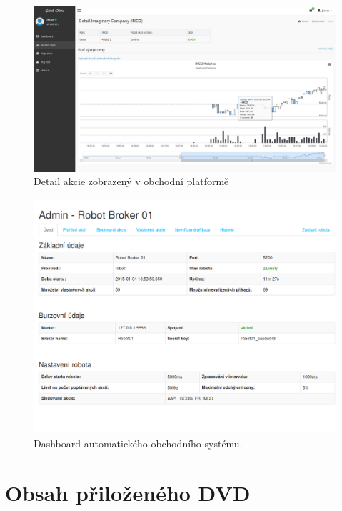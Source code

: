 \documentclass[thesis=M,czech]{FITthesis}[2012/06/26]
\begin{document}
\begin{figure}[h]
	\centering
	\includegraphics[width=1\textwidth]{images/screeny/detail_akcie}
 	\caption[Detail akcie zobrazený v obchodní platformě]{Detail akcie zobrazený v obchodní platformě}
 	\label{fig:debugger}
\end{figure}


\begin{figure}[h]
	\centering
	\includegraphics[width=1\textwidth]{images/screeny/robot_dashboard}
 	\caption[Dashboard automatického obchodního systému]{Dashboard automatického obchodního systému.}
 	\label{fig:debugger}
\end{figure}



\chapter{Obsah přiloženého DVD}
\end{document}
